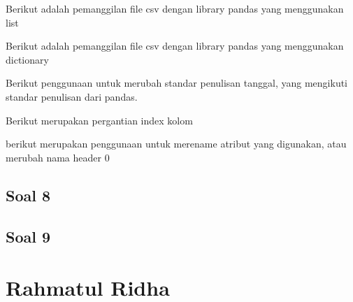 \item Berikut adalah pemanggilan file csv dengan library pandas yang menggunakan list


\item Berikut adalah pemanggilan file csv dengan library pandas yang menggunakan dictionary


\item Berikut penggunaan untuk merubah standar penulisan tanggal, yang mengikuti standar penulisan dari pandas.


\item Berikut merupakan pergantian index kolom



\item berikut merupakan penggunaan untuk merename atribut yang digunakan, atau merubah nama header 0


\subsection{Soal 8}


\subsection{Soal 9}







\section{Rahmatul Ridha}

